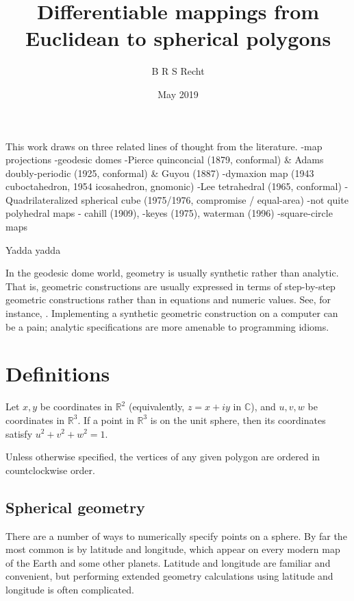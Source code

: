 \documentclass{amsart}[12pt]
\title{Differentiable mappings from Euclidean to spherical polygons}
\author{B R S Recht}
\date{May 2019}
\begin{document}
\maketitle

This work draws on three related lines of thought from the literature.
-map projections
-geodesic domes
-Pierce quinconcial (1879, conformal) & Adams doubly-periodic (1925, conformal) & Guyou (1887)
-dymaxion map (1943 cuboctahedron, 1954 icosahedron, gnomonic)
-Lee tetrahedral (1965, conformal)
-Quadrilateralized spherical cube (1975/1976, compromise / equal-area)
-not quite polyhedral maps - cahill (1909), -keyes (1975), waterman (1996)
-square-circle maps

Yadda yadda\cite{kahn}

In the geodesic dome world, geometry is usually synthetic rather than
analytic. That is, geometric constructions are usually expressed in terms of
step-by-step geometric constructions rather than in equations and numeric
values. See, for instance, \cite{kenner}. Implementing a synthetic geometric
construction on a computer can be a pain; analytic specifications are more
amenable to programming idioms.

\section{Definitions}
Let $x,y$ be coordinates in $\mathbb{R}^2$ (equivalently, $z = x + i y$ in
$\mathbb{C}$), and $u,v,w$ be coordinates in $\mathbb{R}^3$.
If a point in $\mathbb{R}^3$ is on the unit sphere,
then its coordinates satisfy $u^2 + v^2 + w^2 = 1$.

Unless otherwise specified, the vertices of any given polygon are ordered in
countclockwise order.

\subsection{Spherical geometry}
There are a number of ways to numerically specify points on a sphere. By far
the most common is by latitude and longitude, which appear on every modern map
of the Earth and some other planets. Latitude and longitude are
familiar and convenient, but performing extended geometry calculations using
latitude and longitude is often complicated.
\end{document}
